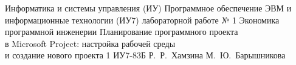 \documentclass{bmstu}
\begin{document}
\makereporttitle
	{Информатика и системы управления (ИУ)}
	{Программное обеспечение ЭВМ и информационные технологии (ИУ7)}
	{лабораторной работе № 1}
	{Экономика программной инженерии}
	{Планирование программного проекта\\в Microsoft Project: настройка рабочей среды\\и создание нового проекта}
	{1}
	{ИУ7-83Б}
	{Р.~Р.~Хамзина}
	{М.~Ю.~Барышникова}


\end{document}

